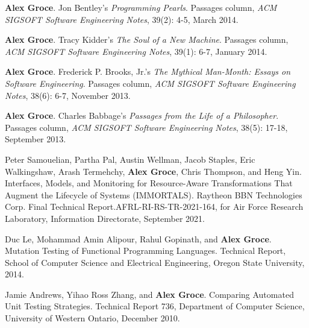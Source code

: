 \documentclass[ComputerScience]{vita}
\begin{document}
\begin{vita}
\begin{Columns, Book Reviews, and Magazine Articles}
\item {\bf Alex Groce}.
\newblock Jon Bentley's \emph{Programming Pearls}.
\newblock Passages column, \emph{ACM SIGSOFT Software Engineering Notes}, 39(2): 4-5, March 2014.

\item {\bf Alex Groce}.
\newblock Tracy Kidder's \emph{The Soul of a New Machine}.
\newblock Passages column, \emph{ACM SIGSOFT Software Engineering Notes}, 39(1): 6-7, January 2014.

\item {\bf Alex Groce}.
\newblock Frederick P. Brooks, Jr.'s \emph{The Mythical Man-Month: Essays on Software Engineering}.
\newblock Passages column, \emph{ACM SIGSOFT Software Engineering Notes}, 38(6): 6-7, November 2013.

\item {\bf Alex Groce}.
\newblock Charles Babbage's \emph{Passages from the Life of a Philosopher}.
\newblock Passages column, \emph{ACM SIGSOFT Software Engineering Notes}, 38(5): 17-18, September 2013.
\end{Columns, Book Reviews, and Magazine Articles}

\begin{Technical Reports}
\item
Peter Samouelian, Partha Pal, Austin Wellman, Jacob Staples, Eric
Walkingshaw, Arash Termehchy, {\bf Alex Groce}, Chris Thompson, and
Heng Yin.
\newblock Interfaces, Models, and Monitoring for Resource-Aware
Transformations That Augment the Lifecycle of Systems (IMMORTALS).
\newblock Raytheon BBN Technologies Corp. Final Technical
Report.AFRL-RI-RS-TR-2021-164, for Air Force Research Laboratory,
Information Directorate, September 2021.

  
\item
Duc Le, Mohammad Amin Alipour, Rahul Gopinath, and {\bf Alex Groce}.
\newblock Mutation Testing of Functional Programming Languages.
\newblock Technical Report, School of Computer Science and Electrical Engineering, Oregon State University, 2014.

\item
Jamie Andrews, Yihao Ross Zhang, and {\bf Alex Groce}.
\newblock Comparing Automated Unit Testing Strategies.
\newblock Technical Report 736, Department of Computer Science, University of Western Ontario, December 2010.


\end{Technical Reports}
\end{vita}
\end{document}
